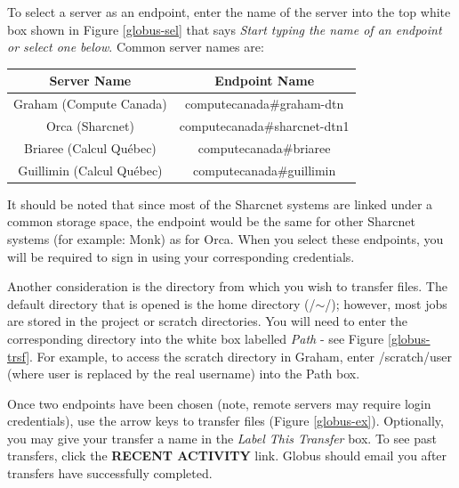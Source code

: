 \documentclass[12pt]{article}
\begin{document}
\quad To select a server as an endpoint, enter the name of the server into the top white box shown in Figure \ref{globus-sel} that says \textit{Start typing the name of an endpoint or select one below}. Common server names are:

\begin{table}[H]
\centering
{\renewcommand{\arraystretch}{1.2}%
\begin{tabular}{c|c}
Server Name & Endpoint Name \\
\hline
Graham (Compute Canada) & computecanada\#graham-dtn \\
Orca (Sharcnet) & computecanada\#sharcnet-dtn1 \\
Briaree (Calcul Qu\'{e}bec) & computecanada\#briaree \\
Guillimin (Calcul Qu\'{e}bec) & computecanada\#guillimin
\end{tabular}
}
\end{table}

It should be noted that since most of the Sharcnet systems are linked under a common storage space, the endpoint would be the same for other Sharcnet systems (for example: Monk) as for Orca. When you select these endpoints, you will be required to sign in using your corresponding credentials. 

\quad Another consideration is the directory from which you wish to transfer files. The default directory that is opened is the home directory (/$\sim$/); however, most jobs are stored in the project or scratch directories. You will need to enter the corresponding directory into the white box labelled \textit{Path} - see Figure \ref{globus-trsf}. For example, to access the scratch directory in Graham, enter /scratch/user (where user is replaced by the real username) into the Path box.

\quad Once two endpoints have been chosen (note, remote servers may require login credentials), use the arrow keys to transfer files (Figure \ref{globus-ex}). Optionally, you may give your transfer a name in the \textit{Label This Transfer} box. To see past transfers, click the \textbf{RECENT ACTIVITY} link. Globus should email you after transfers have successfully completed.
\end{document}
